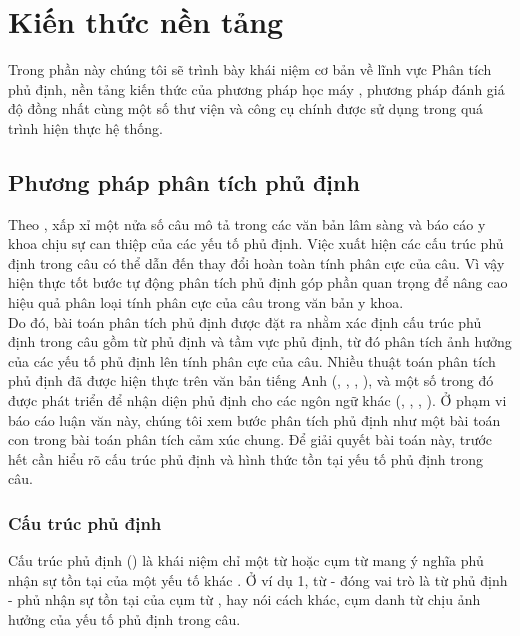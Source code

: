 \chapter{Kiến thức nền tảng} \label{sec:kienthucnentang}
\thispagestyle{empty}
Trong phần này chúng tôi sẽ trình bày khái niệm cơ bản về lĩnh vực Phân tích phủ định, nền tảng kiến thức của phương pháp học máy , phương pháp đánh giá độ đồng nhất  cùng một số thư viện và công cụ chính được sử dụng trong quá trình hiện thực hệ thống.
\pagebreak
\section{Phương pháp phân tích phủ định}
Theo \cite{chapman2001evaluation}, xấp xỉ một nửa số câu mô tả trong các văn bản lâm sàng và báo cáo y khoa chịu sự can thiệp của các yếu tố phủ định. Việc xuất hiện các cấu trúc phủ định trong câu có thể dẫn đến thay đổi hoàn toàn tính phân cực của câu. Vì vậy hiện thực tốt bước tự động phân tích phủ định góp phần quan trọng để nâng cao hiệu quả phân loại tính phân cực của câu trong văn bản y khoa.\\

Do đó, bài toán phân tích phủ định được đặt ra nhằm xác định cấu trúc phủ định trong câu gồm từ phủ định và tầm vực phủ định, từ đó phân tích ảnh hưởng của các yếu tố phủ định lên tính phân cực của câu. Nhiều thuật toán phân tích phủ định đã được hiện thực trên văn bản tiếng Anh (\cite{chapman2001evaluation}, \cite{Mutalik2001}, \cite{Elkin2005}, \cite{Zeng2007}), và một số trong đó được phát triển để nhận diện phủ định cho các ngôn ngữ khác (\cite{benamara2012how}, \cite{Chapman2013}, \cite{costumero2014an}, \cite{CruzDiaz2015}). Ở phạm vi báo cáo luận văn này, chúng tôi xem bước phân tích phủ định như một bài toán con trong bài toán phân tích cảm xúc chung. Để giải quyết bài toán này, trước hết cần hiểu rõ cấu trúc phủ định và hình thức tồn tại yếu tố phủ định trong câu.

\subsection*{Cấu trúc phủ định}
Cấu trúc phủ định () là khái niệm chỉ một từ hoặc cụm từ mang ý nghĩa phủ nhận sự tồn tại của một yếu tố khác \cite{skeppstedt2016marker}. Ở ví dụ 1, từ  - đóng vai trò là từ phủ định - phủ nhận sự tồn tại của cụm từ , hay nói cách khác, cụm danh từ  chịu ảnh hưởng của yếu tố phủ định trong câu.
